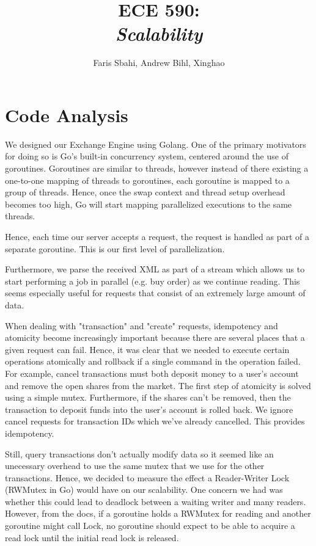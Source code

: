 \documentclass[titlepage, 11pt]{article}
\title{ECE 590: \\\textit{Scalability}}
\author{Faris Sbahi, Andrew Bihl, Xinghao}
\newcommand\0{\mathbf{0}}
\newcommand\<{\langle}
\renewcommand\>{\rangle}
\begin{document}
\maketitle

\section{Code Analysis}

We designed our Exchange Engine using Golang. One of the primary motivators for doing so is Go's built-in concurrency system, centered around the use of goroutines. Goroutines are similar to threads, however instead of there existing a one-to-one mapping of threads to goroutines, each goroutine is mapped to a group of threads. Hence, once the swap context and thread setup overhead becomes too high, Go will start mapping parallelized executions to the same threads.

Hence, each time our server accepts a request, the request is handled as part of a separate goroutine. This is our first level of parallelization.

Furthermore, we parse the received XML as part of a stream which allows us to start performing a job in parallel (e.g. buy order) as we continue reading. This seems especially useful for requests that consist of an extremely large amount of data.

When dealing with "transaction" and "create" requests, idempotency and atomicity become increasingly important because there are several places that a given request can fail. Hence, it was clear that we needed to execute certain operations atomically and rollback if a single command in the operation failed. For example, cancel transactions must both deposit money to a user's account and remove the open shares from the market. The first step of atomicity is solved using a simple mutex. Furthermore, if the shares can't be removed, then the transaction to deposit funds into the user's account is rolled back. We ignore cancel requests for transaction IDs which we've already cancelled. This provides idempotency.

Still, query transactions don't actually modify data so it seemed like an unecessary overhead to use the same mutex that we use for the other transactions. Hence, we decided to measure the effect a Reader-Writer Lock (RWMutex in Go) would have on our scalability. One concern we had was whether this could lead to deadlock between a waiting writer and many readers. However, from the docs, if a goroutine holds a RWMutex for reading and another goroutine might call Lock, no goroutine should expect to be able to acquire a read lock until the initial read lock is released.
\end{document}
